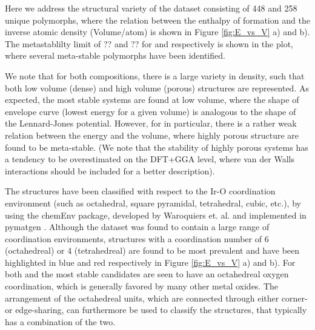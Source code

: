 %
Here we address the structural variety of the dataset consisting of 448 \IrOtwo and 258 \IrOthree unique polymorphs, where the relation between the enthalpy of formation and the inverse atomic density (Volume/atom) is shown in Figure \ref{fig:E_vs_V} a) and b). The metastablilty limit of ?? and ?? for \IrOtwo and \IrOthree respectively is shown in the plot, where several meta-stable polymorphs have been identified.

We note that for both compositions, there is a large variety in density, such that both low volume (dense) and high volume (porous) structures are represented. As expected, the most stable systems are found at low volume, where the shape of envelope curve (lowest energy for a given volume) is analogous to the shape of the Lennard-Jones potential. However, for \IrOthree in particular, there is a rather weak relation between the energy and the volume, where highly porous structure are found to be meta-stable. (We note that the stability of highly porous systems has a tendency to be overestimated on the DFT+GGA level, where van der Walls interactions should be included for a better description).

The structures have been classified with respect to the Ir-O coordination environment (such as octahedral, square pyramidal, tetrahedral, cubic, etc.), by using the chemEnv package, developed by Waroquiers et. al. \cite{Waroquiers2017} and implemented in pymatgen \cite{Ong2013}. Although the dataset was found to contain a large range of coordination environments, structures with a coordination number of 6 (octahedreal) or 4 (tetrahedreal) are found to be most prevalent and have been highlighted in blue and red respectively in Figure \ref{fig:E_vs_V} a) and b). For both \IrOtwo and \IrOthree the most stable candidates are seen to have an octahedreal oxygen coordination, which is generally favored by many other metal oxides. \cite{Waroquiers2017} The arrangement of the octahedreal units, which are connected through either corner- or edge-sharing, can furthermore be used to classify the structures, that typically has a combination of the two. 

